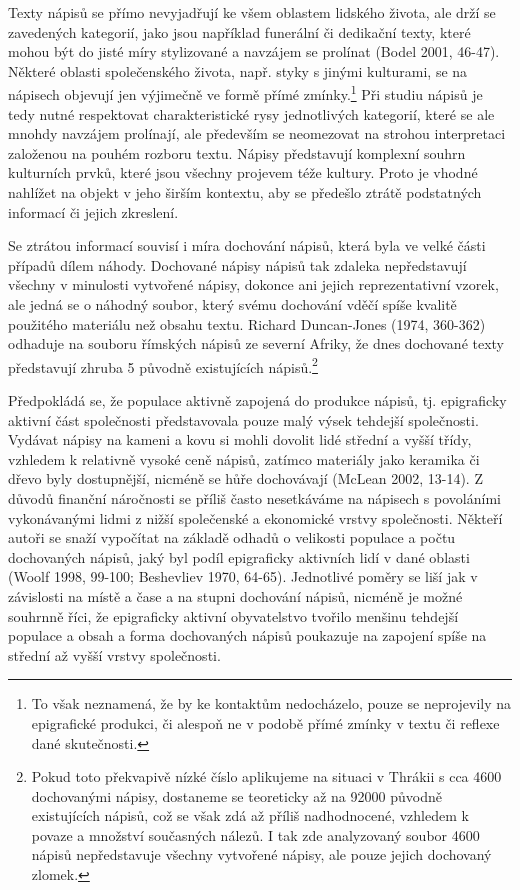 Texty nápisů se přímo nevyjadřují ke všem oblastem lidského života, ale drží se zavedených kategorií, jako jsou například funerální či dedikační texty, které mohou být do jisté míry stylizované a navzájem se prolínat (Bodel 2001, 46-47). Některé oblasti společenského života, např. styky s jinými kulturami, se na nápisech objevují jen výjimečně ve formě přímé zmínky.\footnote{To však neznamená, že by ke kontaktům nedocházelo, pouze se neprojevily na epigrafické produkci, či alespoň ne v podobě přímé zmínky v textu či reflexe dané skutečnosti.} Při studiu nápisů je tedy nutné respektovat charakteristické rysy jednotlivých kategorií, které se ale mnohdy navzájem prolínají, ale především se neomezovat na strohou interpretaci založenou na pouhém rozboru textu. Nápisy představují komplexní souhrn kulturních prvků, které jsou všechny projevem téže kultury. Proto je vhodné nahlížet na objekt v jeho širším kontextu, aby se předešlo ztrátě podstatných informací či jejich zkreslení.

Se ztrátou informací souvisí i míra dochování nápisů, která byla ve velké části případů dílem náhody. Dochované nápisy nápisů tak zdaleka nepředstavují všechny v minulosti vytvořené nápisy, dokonce ani jejich reprezentativní vzorek, ale jedná se o náhodný soubor, který svému dochování vděčí spíše kvalitě použitého materiálu než obsahu textu. Richard Duncan-Jones (1974, 360-362) odhaduje na souboru římských nápisů ze severní Afriky, že dnes dochované texty představují zhruba 5  původně existujících nápisů.\footnote{Pokud toto překvapivě nízké číslo aplikujeme na situaci v Thrákii s cca 4600 dochovanými nápisy, dostaneme se teoreticky až na 92000 původně existujících nápisů, což se však zdá až příliš nadhodnocené, vzhledem k povaze a množství současných nálezů. I tak zde analyzovaný soubor 4600 nápisů nepředstavuje všechny vytvořené nápisy, ale pouze jejich dochovaný zlomek.}

Předpokládá se, že populace aktivně zapojená do produkce nápisů, tj. epigraficky aktivní část společnosti představovala pouze malý výsek tehdejší společnosti. Vydávat nápisy na kameni a kovu si mohli dovolit lidé střední a vyšší třídy, vzhledem k relativně vysoké ceně nápisů, zatímco materiály jako keramika či dřevo byly dostupnější, nicméně se hůře dochovávají (McLean 2002, 13-14). Z důvodů finanční náročnosti se příliš často nesetkáváme na nápisech s povoláními vykonávanými lidmi z nižší společenské a ekonomické vrstvy společnosti. Někteří autoři se snaží vypočítat na základě odhadů o velikosti populace a počtu dochovaných nápisů, jaký byl podíl epigraficky aktivních lidí v dané oblasti (Woolf 1998, 99-100; Beshevliev 1970, 64-65). Jednotlivé poměry se liší jak v závislosti na místě a čase a na stupni dochování nápisů, nicméně je možné souhrnně říci, že epigraficky aktivní obyvatelstvo tvořilo menšinu tehdejší populace a obsah a forma dochovaných nápisů poukazuje na zapojení spíše na střední až vyšší vrstvy společnosti.

